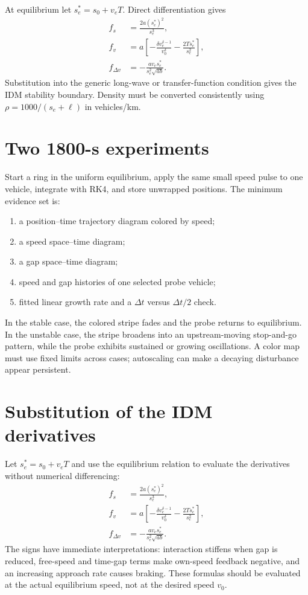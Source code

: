 \documentclass[11pt,a4paper,openany]{book}
\numberwithin{equation}{chapter}
\numberwithin{figure}{chapter}
\numberwithin{table}{chapter}
\begin{document}
At equilibrium let $s^*_e=s_0+v_eT$. Direct differentiation gives
\begin{align}
f_s&=\frac{2a(s^*_e)^2}{s_e^3},\\
f_v&=a\left[-\frac{\delta v_e^{\delta-1}}{v_0^\delta}-\frac{2Ts^*_e}{s_e^2}\right],\\
f_{\Delta v}&=-\frac{a v_es^*_e}{s_e^2\sqrt{ab}}.
\end{align}
Substitution into the generic long-wave or transfer-function condition gives the IDM stability boundary. Density must be converted consistently using $\rho=1000/(s_e+\ell)$ in vehicles/km.

\section{Two 1800-s experiments}
Start a ring in the uniform equilibrium, apply the same small speed pulse to one vehicle, integrate with RK4, and store unwrapped positions. The minimum evidence set is:
\begin{enumerate}
\item a position--time trajectory diagram colored by speed;
\item a speed space--time diagram;
\item a gap space--time diagram;
\item speed and gap histories of one selected probe vehicle;
\item fitted linear growth rate and a $\Delta t$ versus $\Delta t/2$ check.
\end{enumerate}
In the stable case, the colored stripe fades and the probe returns to equilibrium. In the unstable case, the stripe broadens into an upstream-moving stop-and-go pattern, while the probe exhibits sustained or growing oscillations. A color map must use fixed limits across cases; autoscaling can make a decaying disturbance appear persistent.

\section{Substitution of the IDM derivatives}
Let $s_e^*=s_0+v_eT$ and use the equilibrium relation to evaluate the derivatives without numerical differencing:
\begin{align}
f_s&=\frac{2a(s_e^*)^2}{s_e^3},\\
f_v&=a\left[-\frac{\delta v_e^{\delta-1}}{v_0^\delta}-\frac{2Ts_e^*}{s_e^2}\right],\\
f_{\Delta v}&=-\frac{a v_es_e^*}{s_e^2\sqrt{ab}}.
\end{align}
The signs have immediate interpretations: interaction stiffens when gap is reduced, free-speed and time-gap terms make own-speed feedback negative, and an increasing approach rate causes braking. These formulas should be evaluated at the actual equilibrium speed, not at the desired speed $v_0$.
\end{document}
